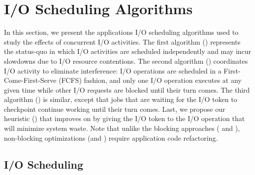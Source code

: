 
\section{I/O Scheduling Algorithms}
\label{sec:algorithms}

In this section, we present the applications I/O scheduling algorithms used to study
the effects of concurrent I/O activities.  The first algorithm (\nocoop) represents
the status-quo in which I/O activities are scheduled independently and may incur
slowdowns due to I/O resource contentions. The second algorithm (\fifoblock)
coordinates I/O activity to eliminate interference: I/O operations are scheduled in a
First-Come-First-Serve (FCFS) fashion, and only one I/O operation executes at any
given time while other I/O requests are blocked until their turn comes.  The third
algorithm (\fifononblock) is similar, except that jobs that are waiting
for the I/O token to checkpoint continue working until their turn comes.
Last, we propose our heuristic (\leastwaste) that improves on \fifononblock by giving
the I/O token to the I/O operation that will minimize system waste. Note that unlike the blocking approaches (\nocoop
and \fifoblock), non-blocking optimizations (\fifononblock and
\cooperative) require application code refactoring.



\subsection{\nocoop I/O Scheduling}

